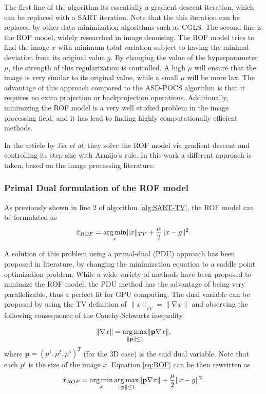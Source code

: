The first line of the algorithm its essentially a gradient descent iteration, which can be replaced with a SART iteration. Note that the this iteration can be replaced by other data-minimization algorithms such as CGLS. The second line is the ROF model, widely researched in image denoising. The ROF model tries to find the image $x$ with minimum total variation subject to having the minimal deviation from its original value $g$. By changing the value of the hyperparameter $\mu$, the strength of this regularization is controlled. A high $\mu$ will ensure that the image is very similar to its original value, while a small $\mu$ will be more lax. The advantage of this approach compared to the ASD-POCS algorithm is that it requires no extra projection or backprojection operations. Additionally, minimizing the ROF model is a very well studied problem in the image processing field, and it has lead to finding highly computationally efficient methods.

 In the article by Jia \emph{et al}, they solve the ROF model via gradient descent and controlling its step size with Armijo's rule. In this work a different approach is taken, based on the image processing literature.
 
 \subsubsection{Primal Dual formulation of the ROF model}
 
As previously shown in line 2 of algorithm \ref{alg:SART-TV}, the ROF model can be formulated as 
\begin{equation}
\hat{x}_{ROF}=\mathop{\mathrm{arg\,min}}_x  \lVert x\rVert_{TV}+\frac{\mu}{2} \lVert x-g \rVert^2.\label{eq:ROF}
\end{equation}

A solution of this problem using a primal-dual (PDU) approach has been proposed in literature\cite{zhu2008efficient}, by changing the minimization equation to a saddle point optimization problem. While a wide variety of methods have been proposed to minimize the ROF model\cite{RUDIN}\cite{vogel1996iterative}\cite{chambolle2004algorithm}, the PDU method has the advantage of being very parallelizable, thus a perfect fit for GPU computing. The dual variable can be proposed by using the TV definition of $\lVert x\rVert_{TV}=\lVert \nabla x \rVert$ and observing the following consequence of the Cauchy-Schwartz inequality

\begin{equation}
\lVert \nabla x \rVert=\mathop{\mathrm{arg\,max}}_{\lVert\textbf{p}\rVert\leq 1} \lVert\textbf{p}\nabla x\rVert,
\end{equation}
where $\textbf{p}=(p^1,p^2,p^3)^T$ (for the 3D case) is the said dual variable. Note that each $p^i$ is the size of the image $x$. Equation \ref{eq:ROF} can be then rewritten as
\begin{equation}
\hat{x}_{ROF}=\mathop{\mathrm{arg\,min}}_x \mathop{\mathrm{arg\,max}}_{\lVert\textbf{p}\rVert\leq 1}\lVert\textbf{p}\nabla x\rVert + \frac{\mu}{2} \lVert x-g \rVert^2.\label{eq:PUD}
\end{equation}

